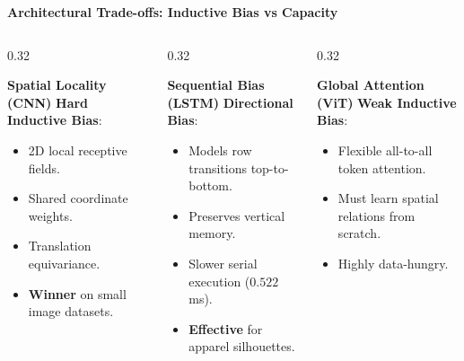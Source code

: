 \documentclass[aspectratio=169, 10pt]{beamer}
\begin{document}
\begin{frame}{\textbf{Architectural Trade-offs: Inductive Bias vs Capacity}}
  \begin{columns}[t]
    \begin{column}{0.32\textwidth}
      \begin{block}{\textbf{Spatial Locality (CNN)}}
        \scriptsize
        \textbf{Hard Inductive Bias}:
        \begin{itemize}\tiny
          \item 2D local receptive fields.
          \item Shared coordinate weights.
          \item Translation equivariance.
          \item \textbf{Winner} on small image datasets.
        \end{itemize}
      \end{block}
    \end{column}
    \begin{column}{0.32\textwidth}
      \begin{block}{\textbf{Sequential Bias (LSTM)}}
        \scriptsize
        \textbf{Directional Bias}:
        \begin{itemize}\tiny
          \item Models row transitions top-to-bottom.
          \item Preserves vertical memory.
          \item Slower serial execution ($0.522$ ms).
          \item \textbf{Effective} for apparel silhouettes.
        \end{itemize}
      \end{block}
    \end{column}
    \begin{column}{0.32\textwidth}
      \begin{block}{\textbf{Global Attention (ViT)}}
        \scriptsize
        \textbf{Weak Inductive Bias}:
        \begin{itemize}\tiny
          \item Flexible all-to-all token attention.
          \item Must learn spatial relations from scratch.
          \item Highly data-hungry.

\end{itemize}
\end{block}
\end{column}
\end{columns}
\end{frame}
\end{document}
